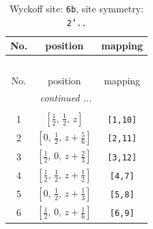 \documentclass[fleqn,8pt]{jsarticle}
\begin{document}
\begin{longtable}{ccc}
\caption{Wyckoff site: {\tt 6b}, site symmetry: {\tt 2'..}}
 \\
 \hline \hline
No. & position & mapping \\ \hline \endfirsthead

\multicolumn{2}{l}{\tablename\ \thetable{}} \\
 \hline \hline
No. & position & mapping \\ \hline \endhead

 \hline \hline
\multicolumn{2}{r}{\footnotesize\it continued ...} \\ \endfoot

 \hline \hline
\multicolumn{2}{r}{} \\ \endlastfoot

1 & $\left[ \frac{1}{2},\, \frac{1}{2},\, z \right]$ & {\tt [1,10]} \\ \hline
2 & $\left[ 0,\, \frac{1}{2},\, z + \frac{5}{6} \right]$ & {\tt [2,11]} \\ \hline
3 & $\left[ \frac{1}{2},\, 0,\, z + \frac{2}{3} \right]$ & {\tt [3,12]} \\ \hline
4 & $\left[ \frac{1}{2},\, \frac{1}{2},\, z + \frac{1}{2} \right]$ & {\tt [4,7]} \\ \hline
5 & $\left[ 0,\, \frac{1}{2},\, z + \frac{1}{3} \right]$ & {\tt [5,8]} \\ \hline
6 & $\left[ \frac{1}{2},\, 0,\, z + \frac{1}{6} \right]$ & {\tt [6,9]} \\
\end{longtable}
\renewcommand{\arraystretch}{1.2}
\end{document}
